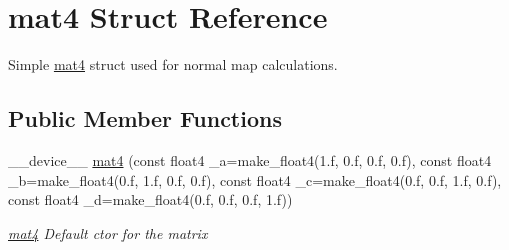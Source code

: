 \hypertarget{structmat4}{\section{mat4 Struct Reference}
\label{structmat4}
}


Simple \hyperlink{structmat4}{mat4} struct used for normal map calculations.  


\subsection*{Public Member Functions}
\begin{DoxyCompactItemize}
\item 
\-\_\-\-\_\-device\-\_\-\-\_\- \hyperlink{structmat4_a5d51b0d9907ab69afff96ddc8a12aaba}{mat4} (const float4 \-\_\-a=make\-\_\-float4(1.f, 0.f, 0.f, 0.f), const float4 \-\_\-b=make\-\_\-float4(0.f, 1.f, 0.f, 0.f), const float4 \-\_\-c=make\-\_\-float4(0.f, 0.f, 1.f, 0.f), const float4 \-\_\-d=make\-\_\-float4(0.f, 0.f, 0.f, 1.f))
\begin{DoxyCompactList}\small\item\em \hyperlink{structmat4}{mat4} Default ctor for the matrix \end{DoxyCompactList}\end{DoxyCompactItemize}
